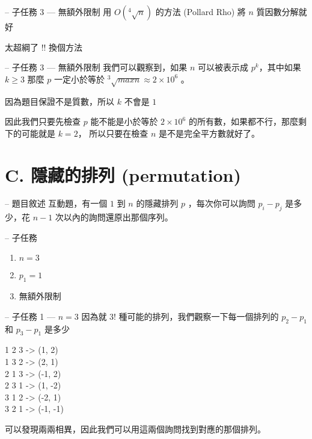 \documentclass[hyperref,UTF8,notheorems,xcolor={dvipsnames}]{beamer}
\newcommand{\btitle}[1]{{\secname} -- #1}
\theoremstyle{definition}
\begin{document}
\begin{frame}[fragile]{\btitle{子任務 3 --- 無額外限制}}
	用 $O(^4\sqrt{n})$ 的方法 (Pollard Rho) 將 $n$ 質因數分解就好
	\pause

	太超綱了 !! 換個方法
\end{frame}

\begin{frame}[fragile]{\btitle{子任務 3 --- 無額外限制}}
	我們可以觀察到，如果 $n$ 可以被表示成 $p^k$，其中如果 $k \ge 3$ 那麼 $p$ 一定小於等於 $^3 \sqrt{maxn} \approx 2 \times 10^6$ 。
	\pause

	因為題目保證不是質數，所以 $k$ 不會是 $1$
	\pause

	因此我們只要先檢查 $p$ 能不能是小於等於 $2 \times 10^6$ 的所有數，如果都不行，那麼剩下的可能就是 $k = 2$， 所以只要在檢查 $n$ 是不是完全平方數就好了。

\end{frame}

\section{C. 隱藏的排列 (permutation)}

\begin{frame}[fragile]{\btitle{題目敘述}}
	互動題，有一個 $1$ 到 $n$ 的隱藏排列 $p$ ，每次你可以詢問 $p_i - p_j$ 是多少，花 $n - 1$ 次以內的詢問還原出那個序列。
\end{frame}

\begin{frame}[fragile]{\btitle{子任務}}
	\begin{enumerate}
		\item $n = 3$
		\item $p_1 = 1$
		\item 無額外限制
	\end{enumerate}
\end{frame}

\begin{frame}[fragile]{\btitle{子任務 1 --- $n = 3$}}
	因為就 3! 種可能的排列，我們觀察一下每一個排列的 $p_2 - p_1$ 和 $p_3 - p_1$ 是多少 
	\pause

	1 2 3 -> (1, 2)  \\
	1 3 2 -> (2, 1)  \\
	2 1 3 -> (-1, 2)  \\
	2 3 1 -> (1, -2)  \\
	3 1 2 -> (-2, 1)  \\
	3 2 1 -> (-1, -1)
	\pause

	可以發現兩兩相異，因此我們可以用這兩個詢問找到對應的那個排列。
\end{frame}
\end{document}
